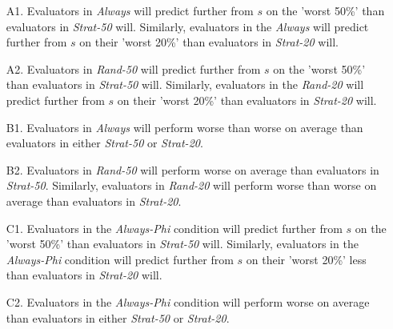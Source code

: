 \documentclass[10pt]{article}
\begin{document}
\begin{enumerate}
	\item [A1.] Evaluators in \textit{Always} will predict further from $s$ on the 'worst 50\%' than evaluators in \textit{Strat-50} will. Similarly, evaluators in the \textit{Always} will predict further from $s$ on their 'worst 20\%' than evaluators in \textit{Strat-20} will.
	\item [A2.] Evaluators in \textit{Rand-50} will predict further from $s$ on the 'worst 50\%' than evaluators in \textit{Strat-50} will. Similarly, evaluators in the \textit{Rand-20} will predict further from $s$ on their 'worst 20\%' than evaluators in \textit{Strat-20} will.
	\item [B1.] Evaluators in \textit{Always} will perform worse than worse on average than evaluators in either \textit{Strat-50} or \textit{Strat-20}.
	\item [B2.] Evaluators in \textit{Rand-50} will perform worse on average than evaluators in \textit{Strat-50}. Similarly, evaluators in \textit{Rand-20} will perform worse than worse on average than evaluators in \textit{Strat-20}.
	\item [C1.] Evaluators in the \textit{Always-Phi} condition will predict further from $s$ on the 'worst 50\%' than evaluators in \textit{Strat-50} will.  Similarly, evaluators in the \textit{Always-Phi} condition will predict further from $s$ on their 'worst 20\%' less than evaluators in \textit{Strat-20} will.
	\item [C2.] Evaluators in the \textit{Always-Phi} condition will perform worse on average than evaluators in either \textit{Strat-50} or \textit{Strat-20}.
\end{enumerate}

\textbf{}
\end{document}
